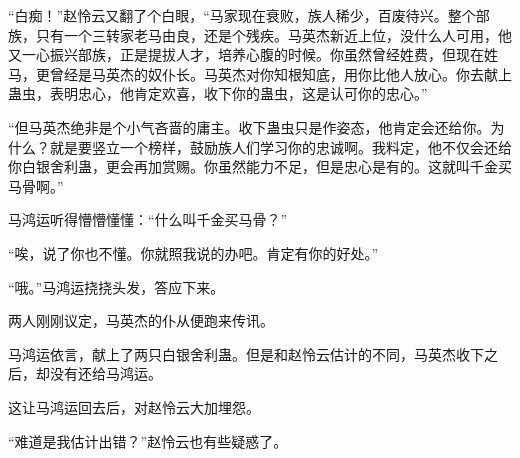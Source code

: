 \begin{this_body}
“白痴！”赵怜云又翻了个白眼，“马家现在衰败，族人稀少，百废待兴。整个部族，只有一个三转家老马由良，还是个残疾。马英杰新近上位，没什么人可用，他又一心振兴部族，正是提拔人才，培养心腹的时候。你虽然曾经姓费，但现在姓马，更曾经是马英杰的奴仆长。马英杰对你知根知底，用你比他人放心。你去献上蛊虫，表明忠心，他肯定欢喜，收下你的蛊虫，这是认可你的忠心。”

“但马英杰绝非是个小气吝啬的庸主。收下蛊虫只是作姿态，他肯定会还给你。为什么？就是要竖立一个榜样，鼓励族人们学习你的忠诚啊。我料定，他不仅会还给你白银舍利蛊，更会再加赏赐。你虽然能力不足，但是忠心是有的。这就叫千金买马骨啊。”

马鸿运听得懵懵懂懂：“什么叫千金买马骨？”

“唉，说了你也不懂。你就照我说的办吧。肯定有你的好处。”

“哦。”马鸿运挠挠头发，答应下来。

两人刚刚议定，马英杰的仆从便跑来传讯。

马鸿运依言，献上了两只白银舍利蛊。但是和赵怜云估计的不同，马英杰收下之后，却没有还给马鸿运。

这让马鸿运回去后，对赵怜云大加埋怨。

“难道是我估计出错？”赵怜云也有些疑惑了。

\end{this_body}

